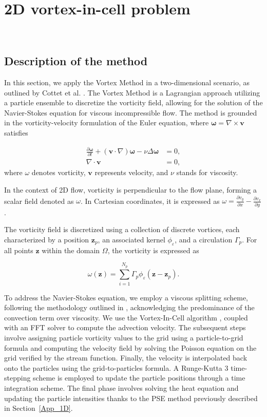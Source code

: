 
\section{2D vortex-in-cell problem}~\label{App_2D}

\subsection{Description of the method}

In this section, we apply the Vortex Method in a two-dimensional scenario, as outlined by Cottet et al. \cite{cottet_vortex_2000}. The Vortex Method is a Lagrangian approach utilizing a particle ensemble to discretize the vorticity field, allowing for the solution of the Navier-Stokes equation for viscous incompressible flow. The method is grounded in the vorticity-velocity formulation of the Euler equation, where $\bm \omega = \nabla \times \bm{v}$ satisfies

\[
	\begin{aligned}
		\frac{\partial \bm \omega}{\partial t} + (\bm{v} \cdot \nabla) \bm \omega - \nu \Delta \bm \omega & = 0, \\
		\nabla \cdot \bm v                                                                                & = 0,
	\end{aligned}
\]where $\omega$ denotes vorticity, $\bm{v}$ represents velocity, and $\nu$ stands for viscosity.

In the context of 2D flow, vorticity is perpendicular to the flow plane, forming a scalar field denoted as $\omega$. In Cartesian coordinates, it is expressed as $\omega = \frac{\partial v_y}{\partial x} - \frac{\partial v_x}{\partial y}$.

The vorticity field is discretized using a collection of discrete vortices, each characterized by a position $\bm z_p$, an associated kernel $\phi_\varepsilon$, and a circulation $\Gamma_p$. For all points $\bm z$ within the domain $\Omega$, the vorticity is expressed as

\begin{equation*}
	\omega(\bm z) = \sum_{i=1}^{N_p} \Gamma_p \phi_\varepsilon(\bm z - \bm z_p).
\end{equation*}

To address the Navier-Stokes equation, we employ a viscous splitting scheme, following the methodology outlined in \cite{cottet_1990}, acknowledging the predominance of the convection term over viscosity. We use the Vortex-In-Cell algorithm \cite{christiansen_1973, birdsall_1969}, coupled with an FFT solver to compute the advection velocity. The subsequent steps involve assigning particle vorticity values to the grid using a particle-to-grid formula and computing the velocity field by solving the Poisson equation on the grid verified by the stream function. Finally, the velocity is interpolated back onto the particles using the grid-to-particles formula. A Runge-Kutta 3 time-stepping scheme is employed to update the particle positions through a time integration scheme. The final phase involves solving the heat equation and updating the particle intensities thanks to the PSE method previously described in Section~\ref{App_1D}.

